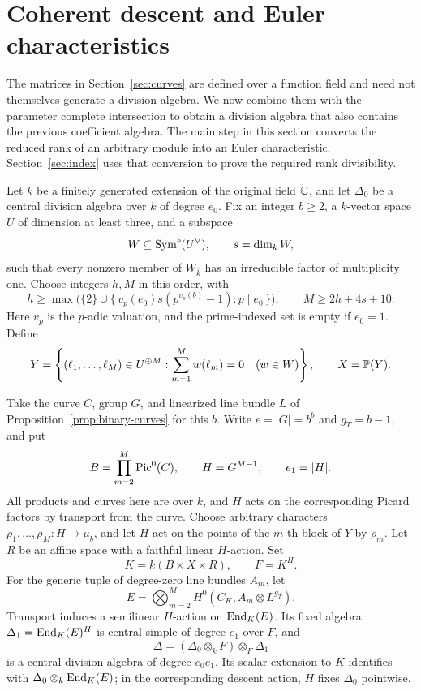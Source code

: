 \section{Coherent descent and Euler characteristics}\label{sec:descent}

The matrices in Section~\ref{sec:curves} are defined over a function
field and need not themselves generate a division algebra.  We now
combine them with the parameter complete intersection to obtain a
division algebra that also contains the previous coefficient algebra.
The main step in this section converts the reduced rank of an arbitrary
module into an Euler characteristic.  Section~\ref{sec:index} uses that
conversion to prove the required rank divisibility.

\begin{theorem}\label{thm:division}
Let \(k\) be a finitely generated extension of the original field
\(\mathbb C\), and let \(\Delta_0\) be a central division algebra over \(k\)
of degree \(e_0\).  Fix an integer \(b\geq2\), a \(k\)-vector space
\(U\) of dimension at least three, and a subspace
\[
W\subseteq\operatorname{Sym}^b(U^\vee),\qquad s=\dim_k W,
\]
such that every nonzero member of \(W_{\bar k}\) has an irreducible
factor of multiplicity one.  Choose integers \(h,M\) in this order,
with
\begin{equation}\label{eq:division-parameters}
h\geq
\max\bigl(\{2\}\cup
\{\,v_p(e_0)s(p^{v_p(b)}-1):p\mid e_0\,\}\bigr),
\qquad M\geq2h+4s+10.
\end{equation}
Here \(v_p\) is the \(p\)-adic valuation, and the prime-indexed set is
empty if \(e_0=1\).
Define
\[
Y=\left\{(\ell_1,\ldots,\ell_M)\in U^{\oplus M}:
          \sum_{m=1}^M w(\ell_m)=0\quad(w\in W)\right\},
\qquad X=\mathbb P(Y).
\]

Take the curve \(C\), group \(G\), and linearized line bundle \(L\)
of Proposition~\ref{prop:binary-curves} for this \(b\).  Write
\(e=|G|=b^b\) and \(g_T=b-1\), and put
\[
B=\prod_{m=2}^M\operatorname{Pic}^0(C),\qquad
H=G^{M-1},\qquad e_1=|H|.
\]
All products and curves here are over \(k\), and \(H\) acts on the
corresponding Picard factors by transport from the curve.
Choose arbitrary characters
\(\rho_1,\ldots,\rho_M:H\to\mu_b\), and let \(H\) act on the
points of the \(m\)-th block of \(Y\) by \(\rho_m\).
Let \(R\) be an affine space with a faithful linear \(H\)-action.
Set
\[
K=k(B\times X\times R),\qquad F=K^H.
\]
For the generic tuple of degree-zero line bundles \(A_m\), let
\[
E=\bigotimes_{m=2}^M H^0(C_K,A_m\otimes L^{g_T}).
\]
Transport induces a semilinear \(H\)-action on \(\operatorname{End}_K(E)\).
Its fixed algebra
\(\Delta_1=\operatorname{End}_K(E)^H\) is central simple of degree \(e_1\)
over \(F\), and
\begin{equation}\label{eq:division-algebra}
\Delta=(\Delta_0\otimes_k F)\otimes_F\Delta_1
\end{equation}
is a central division algebra of degree \(e_0e_1\).
Its scalar extension to \(K\) identifies with
\(\Delta_0\otimes_k\operatorname{End}_K(E)\); in the corresponding descent action,
\(H\) fixes \(\Delta_0\) pointwise.
\end{theorem}

